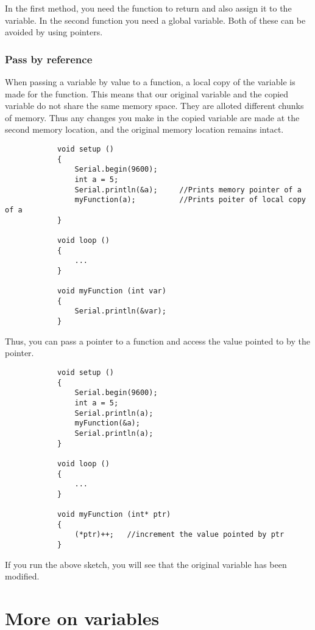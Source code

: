 \documentclass{article}
\begin{document}
			In the first method, you need the function to return and also assign it to the variable. In the second function you need a global variable. Both of these can be avoided by using pointers.

		\subsubsection{Pass by reference}

			When passing a variable by value to a function, a local copy of the variable is made for the function. This means that our original variable and the copied variable do not share the same memory space. They are alloted different chunks of memory. Thus any changes you make in the copied variable are made at the second memory location, and the original memory location remains intact.

			\begin{lstlisting}
			void setup ()
			{
				Serial.begin(9600);
				int a = 5;
				Serial.println(&a);		//Prints memory pointer of a
				myFunction(a);			//Prints poiter of local copy of a
			}

			void loop ()
			{
				...
			}

			void myFunction (int var)
			{
				Serial.println(&var);
			}
			\end{lstlisting}

			Thus, you can pass a pointer to a function and access the value pointed to by the pointer.

			\begin{lstlisting}
			void setup ()
			{
				Serial.begin(9600);
				int a = 5;
				Serial.println(a);
				myFunction(&a);
				Serial.println(a);
			}

			void loop ()
			{
				...
			}

			void myFunction (int* ptr)
			{
				(*ptr)++;	//increment the value pointed by ptr
			}
			\end{lstlisting}

			If you run the above sketch, you will see that the original variable  has been modified.

\section{More on variables}
\end{document}
